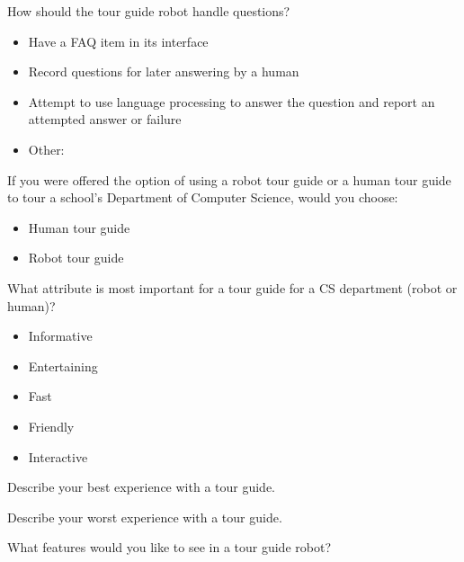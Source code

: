 \documentclass[11pt]{report}
\begin{document}
\begin{appendices}
How should the tour guide robot handle questions?
\begin{itemize}
 \item Have a FAQ item in its interface
 \item Record questions for later answering by a human
 \item Attempt to use language processing to answer the question and report an attempted answer or failure
 \item Other:
\end{itemize}

If you were offered the option of using a robot tour guide or a human tour guide to tour a school's Department of Computer Science, would you choose:
\begin{itemize}
 \item Human tour guide
 \item Robot tour guide
\end{itemize}

What attribute is most important for a tour guide for a CS department (robot or human)? 
\begin{itemize}
 \item Informative
 \item Entertaining
 \item Fast
 \item Friendly
 \item Interactive
\end{itemize}

Describe your best experience with a tour guide.

Describe your worst experience with a tour guide.

What features would you like to see in a tour guide robot?
\end{appendices}
\end{document}
